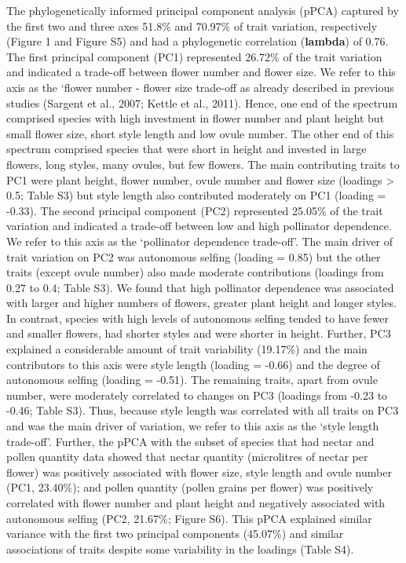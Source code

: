 \documentclass[12pt,a4paper,]{article}
\begin{document}
The phylogenetically informed principal component analysis (pPCA)
captured by the first two and three axes 51.8\% and 70.97\% of trait
variation, respectively (Figure 1 and Figure S5) and had a phylogenetic
correlation (\textbf{lambda}) of 0.76. The first principal component
(PC1) represented 26.72\% of the trait variation and indicated a
trade-off between flower number and flower size. We refer to this axis
as the `flower number - flower size trade-off as already described in
previous studies (Sargent et al., 2007; Kettle et al., 2011). Hence, one
end of the spectrum comprised species with high investment in flower
number and plant height but small flower size, short style length and
low ovule number. The other end of this spectrum comprised species that
were short in height and invested in large flowers, long styles, many
ovules, but few flowers. The main contributing traits to PC1 were plant
height, flower number, ovule number and flower size (loadings
\textgreater{} \textbar{}0.5\textbar{}; Table S3) but style length also
contributed moderately on PC1 (loading = -0.33). The second principal
component (PC2) represented 25.05\% of the trait variation and indicated
a trade-off between low and high pollinator dependence. We refer to this
axis as the `pollinator dependence trade-off'. The main driver of trait
variation on PC2 was autonomous selfing (loading = 0.85) but the other
traits (except ovule number) also made moderate contributions (loadings
from 0.27 to 0.4; Table S3). We found that high pollinator dependence
was associated with larger and higher numbers of flowers, greater plant
height and longer styles. In contrast, species with high levels of
autonomous selfing tended to have fewer and smaller flowers, had shorter
styles and were shorter in height. Further, PC3 explained a considerable
amount of trait variability (19.17\%) and the main contributors to this
axis were style length (loading = -0.66) and the degree of autonomous
selfing (loading = -0.51). The remaining traits, apart from ovule
number, were moderately correlated to changes on PC3 (loadings from
-0.23 to -0.46; Table S3). Thus, because style length was correlated
with all traits on PC3 and was the main driver of variation, we refer to
this axis as the `style length trade-off'. Further, the pPCA with the
subset of species that had nectar and pollen quantity data showed that
nectar quantity (microlitres of nectar per flower) was positively
associated with flower size, style length and ovule number (PC1,
23.40\%); and pollen quantity (pollen grains per flower) was positively
correlated with flower number and plant height and negatively associated
with autonomous selfing (PC2, 21.67\%; Figure S6). This pPCA explained
similar variance with the first two principal components (45.07\%) and
similar associations of traits despite some variability in the loadings
(Table S4).
\end{document}
